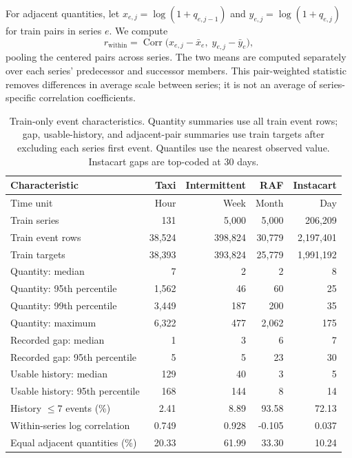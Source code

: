 \documentclass[runningheads]{llncs}
\begin{document}
For adjacent quantities, let $x_{e,j}=\log(1+q_{e,j-1})$ and
$y_{e,j}=\log(1+q_{e,j})$ for train pairs in series $e$. We compute
\begin{equation}
 r_{\mathrm{within}}=\operatorname{Corr}
 \bigl(x_{e,j}-\bar x_e,\;y_{e,j}-\bar y_e\bigr),
 \label{eq:within-correlation}
\end{equation}
pooling the centered pairs across series. The two means are computed
separately over each series' predecessor and successor members. This
pair-weighted statistic removes differences in average scale between series;
it is not an average of series-specific correlation coefficients.

\begin{table}[t]
\caption{Train-only event characteristics. Quantity summaries use all train event rows; gap, usable-history, and adjacent-pair summaries use train targets after excluding each series\textquotesingle{} first event. Quantiles use the nearest observed value. Instacart gaps are top-coded at 30 days.}
\label{tab:train-characteristics}\centering\scriptsize
\setlength{\tabcolsep}{4pt}
\begin{tabular}{lrrrr}
\toprule
Characteristic & Taxi & Intermittent & RAF & Instacart\\
\midrule
Time unit & Hour & Week & Month & Day\\
Train series & 131 & 5,000 & 5,000 & 206,209\\
Train event rows & 38,524 & 398,824 & 30,779 & 2,197,401\\
Train targets & 38,393 & 393,824 & 25,779 & 1,991,192\\
Quantity: median & 7 & 2 & 2 & 8\\
Quantity: 95th percentile & 1,562 & 46 & 60 & 25\\
Quantity: 99th percentile & 3,449 & 187 & 200 & 35\\
Quantity: maximum & 6,322 & 477 & 2,062 & 175\\
Recorded gap: median & 1 & 3 & 6 & 7\\
Recorded gap: 95th percentile & 5 & 5 & 23 & 30\\
Usable history: median & 129 & 40 & 3 & 5\\
Usable history: 95th percentile & 168 & 144 & 8 & 14\\
History $\le7$ events (\%) & 2.41 & 8.89 & 93.58 & 72.13\\
Within-series log correlation & 0.749 & 0.928 & -0.105 & 0.037\\
Equal adjacent quantities (\%) & 20.33 & 61.99 & 33.30 & 10.24\\
\bottomrule
\end{tabular}
\end{table}
\end{document}
